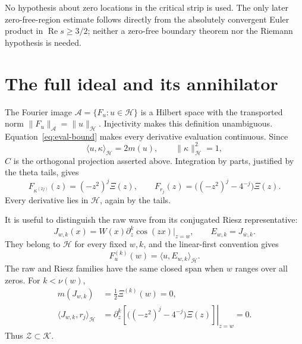 \documentclass[11pt,a4paper]{article}
\numberwithin{equation}{section}
\theoremstyle{definition}
\theoremstyle{remark}
\newcommand{\Hh}{\mathcal H}
\newcommand{\Zz}{\mathcal Z}
\newcommand{\Kk}{\mathcal K}
\newcommand{\Aa}{\mathcal A}
\newcommand{\ip}[2]{\langle #1,#2\rangle}
\newcommand{\norm}[1]{\lVert #1\rVert}
\begin{document}
No hypothesis about zero locations in the critical strip is used. The only later zero-free-region estimate follows directly from the absolutely convergent Euler product in $\operatorname{Re}s\ge3/2$; neither a zero-free boundary theorem nor the Riemann hypothesis is needed.

\section{The full ideal and its annihilator}\label{sec:ideal}

The Fourier image $\Aa=\{F_u:u\in\Hh\}$ is a Hilbert space with the transported norm $\norm{F_u}_{\Aa}=\norm{u}_{\Hh}$. Injectivity makes this definition unambiguous. Equation~\eqref{eq:eval-bound} makes every derivative evaluation continuous. Since
\[
 \ip{u}{\kappa}_{\Hh}=2m(u),\qquad \norm{\kappa}_{\Hh}^2=1,
\]
$C$ is the orthogonal projection asserted above. Integration by parts, justified by the theta tails, gives
\begin{equation}\label{eq:derivative-transforms}
 F_{\kappa^{(2j)}}(z)=(-z^2)^j\Xi(z),\qquad
 F_{r_j}(z)=\bigl((-z^2)^j-4^{-j}\bigr)\Xi(z).
\end{equation}
Every derivative lies in $\Hh$, again by the tails.

It is useful to distinguish the raw wave from its conjugated Riesz representative:
\begin{equation}\label{eq:waves}
 J_{w,k}(x)=W(x)\partial_z^k\cos(zx)|_{z=w},\qquad
 E_{w,k}=J_{\overline w,k}.
\end{equation}
They belong to $\Hh$ for every fixed $w,k$, and the linear-first convention gives
\begin{equation}\label{eq:Riesz}
 F_u^{(k)}(w)=\ip{u}{E_{w,k}}_{\Hh}.
\end{equation}
The raw and Riesz families have the same closed span when $w$ ranges over all zeros. For $k<\nu(w)$,
\begin{align}
 m(J_{w,k})&=\tfrac12\Xi^{(k)}(w)=0,\label{eq:wave-center}\\
 \ip{J_{w,k}}{r_j}_{\Hh}
 &=\left.\partial_z^k\left[\bigl((-z^2)^j-4^{-j}\bigr)\Xi(z)\right]\right|_{z=w}=0.
 \label{eq:wave-radical}
\end{align}
Thus $\Zz\subset\Kk$.
\end{document}
